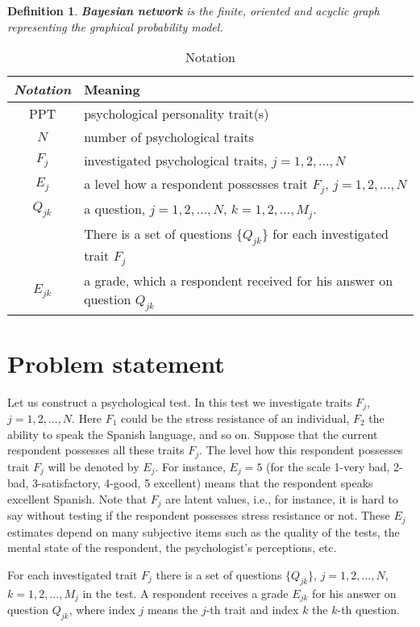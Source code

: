 \documentclass[12pt]{article}
\newtheorem{definition}{Definition}[section]
\begin{document}
%
\begin{definition}
\textbf{Bayesian network} is the finite, oriented and acyclic graph representing the graphical probability model.
 \label{definition8}
\end{definition}
%
\begin{table}[!ht]
\begin{center}
\begin{tabular}{|c|l|}
\hline
\textit {Notation} & Meaning  \\
\hline
PPT & psychological personality trait(s)  \\
\hline
$N$ & number of psychological traits  \\
\hline
$F_j$ & investigated psychological traits, $j=1,2,...,N$  \\
\hline
$E_j$ & a level how a respondent possesses trait $F_j$, $j=1,2,...,N$  \\
\hline
$Q_{jk}$ & a question, $j=1,2,...,N$,  $k=1,2,...,M_j$.\\

&There is a set of questions $\{Q_{jk}\}$ for each investigated trait $F_j$\\
\hline
$E_{jk}$ & a grade, which a respondent received for his answer on question $Q_{jk}$\\
\hline
\end{tabular}
\caption{Notation}
\end{center}
\end{table}
%
%
%
\section{Problem statement}
\label{sec:ProblemStatement}
Let us construct a psychological test. In this test we investigate traits $F_j$, $j=1,2,...,N$. Here $F_1$ could be the stress resistance of an individual, $F_2$ the ability to speak the Spanish language, and so on. Suppose that the current respondent possesses all these traits $F_j$. The level how this respondent possesses trait $F_j$ will be denoted by $E_j$. For instance, $E_j=5$ (for the scale 1-very bad, 2-bad, 3-satisfactory, 4-good, 5 excellent) means that the respondent speaks excellent Spanish. Note that $F_j$ are latent values, i.e., for instance, it is hard to say without testing if the respondent possesses stress resistance or not. These $E_j$ estimates depend on many subjective items such as the quality of the tests, the mental state of the respondent, the psychologist's perceptions, etc. 

For each investigated trait $F_j$ there is a set of questions $\{Q_{jk}\}$,  $j=1,2,...,N$,  $k=1,2,...,M_j$ in the test. A respondent receives a grade $E_{jk}$ for his answer on question $Q_{jk}$, where index $j$ means the $j$-th trait and index $k$ the $k$-th question.
\end{document}
